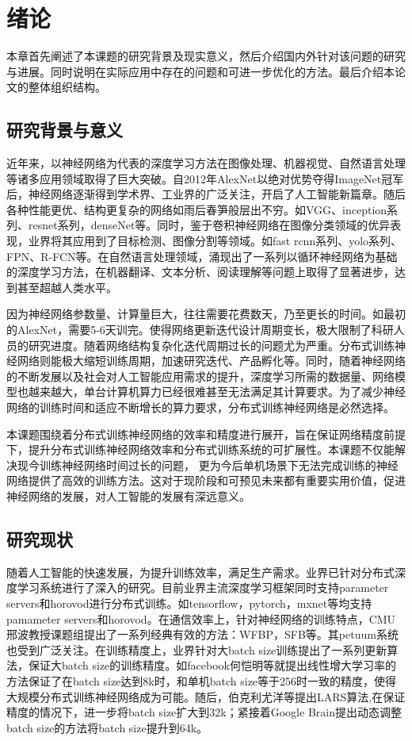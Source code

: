 \chapter{绪论}
本章首先阐述了本课题的研究背景及现实意义，然后介绍国内外针对该问题的研究与进展。同时说明在实际应用中存在的问题和可进一步优化的方法。最后介绍本论文的整体组织结构。
\section{研究背景与意义}
近年来，以神经网络为代表的深度学习方法在图像处理、机器视觉、自然语言处理等诸多应用领域取得了巨大突破。自2012年AlexNet以绝对优势夺得ImageNet冠军后，神经网络逐渐得到学术界、工业界的广泛关注，开启了人工智能新篇章。随后各种性能更优、结构更复杂的网络如雨后春笋般层出不穷。如VGG、inception系列、resnet系列，denseNet等。同时，鉴于卷积神经网络在图像分类领域的优异表现，业界将其应用到了目标检测、图像分割等领域。如fast rcnn系列、yolo系列、FPN、R-FCN等。在自然语言处理领域，涌现出了一系列以循环神经网络为基础的深度学习方法，在机器翻译、文本分析、阅读理解等问题上取得了显著进步，达到甚至超越人类水平。

因为神经网络参数量、计算量巨大，往往需要花费数天，乃至更长的时间。如最初的AlexNet，需要5-6天训完。使得网络更新迭代设计周期变长，极大限制了科研人员的研究进度。随着网络结构复杂化迭代周期过长的问题尤为严重。分布式训练神经网络则能极大缩短训练周期，加速研究迭代、产品孵化等。同时，随着神经网络的不断发展以及社会对人工智能应用需求的提升，深度学习所需的数据量、网络模型也越来越大，单台计算机算力已经很难甚至无法满足其计算要求。为了减少神经网络的训练时间和适应不断增长的算力要求，分布式训练神经网络是必然选择。

本课题围绕着分布式训练神经网络的效率和精度进行展开，旨在保证网络精度前提下，提升分布式训练神经网络效率和分布式训练系统的可扩展性。本课题不仅能解决现今训练神经网络时间过长的问题， 更为今后单机场景下无法完成训练的神经网络提供了高效的训练方法。这对于现阶段和可预见未来都有重要实用价值，促进神经网络的发展，对人工智能的发展有深远意义。

\section{研究现状}
随着人工智能的快速发展，为提升训练效率，满足生产需求。业界已针对分布式深度学习系统进行了深入的研究。目前业界主流深度学习框架同时支持parameter servers和horovod进行分布式训练。如tensorflow，pytorch，mxnet等均支持pamameter servers和horovod。在通信效率上，针对神经网络的训练特点，CMU邢波教授课题组提出了一系列经典有效的方法：WFBP，SFB等。其petuum系统也受到广泛关注。在训练精度上，业界针对大batch size训练提出了一系列更新算法，保证大batch size的训练精度。如facebook何恺明等就提出线性增大学习率的方法保证了在batch size达到8k时，和单机batch size等于256时一致的精度，使得大规模分布式训练神经网络成为可能。随后，伯克利尤洋等提出LARS算法,在保证精度的情况下，进一步将batch size扩大到32k；紧接着Google Brain提出动态调整batch size的方法将batch size提升到64k。
